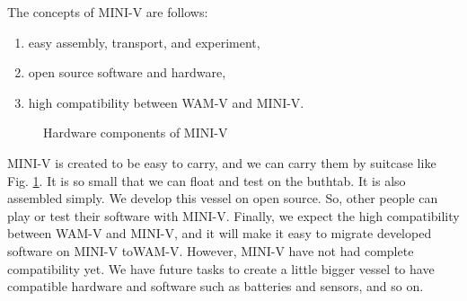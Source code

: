 \documentclass[lettersize,journal]{IEEEtran}
\begin{document}
The concepts of MINI-V are follows:
\begin{enumerate}
  \item easy assembly, transport, and experiment,
  \item open source software and hardware,
  \item high compatibility between WAM-V and MINI-V.
\end{enumerate}

\begin{figure}[H]
    \begin{center}
    \end{center}
    \caption{Hardware components of MINI-V}
    \label{fig:mini_v_component}
\end{figure}

MINI-V is created to be easy to carry, and we can carry them by suitcase like Fig. \ref{fig:mini_v_component}. It is so small that we can
float and test on the buthtab.
It is also assembled simply. We develop this vessel on open source. So, other people can play or test their software with MINI-V. Finally,
we expect the high compatibility between WAM-V and MINI-V, and it will make it easy to migrate developed software on MINI-V toWAM-V. However, 
MINI-V have not had complete compatibility yet.
We have future tasks to create a little bigger vessel to have compatible hardware and software such as batteries and sensors, and so on.
  
\end{document}
